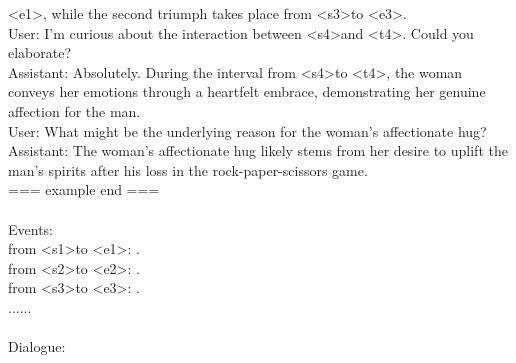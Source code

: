 \documentclass[10pt,twocolumn,letterpaper]{article}
\begin{document}
\begin{figure*}[t]
\begin{tcolorbox}[colback=gray!20, colframe=black, text width=0.9\textwidth, title={Box 4: Prompt for LLM in Stage 3, designed to transform a series of events into high-quality dialogue.}]
\textless e1\textgreater , while the second triumph takes place from \textless s3\textgreater  to \textless e3\textgreater .\\User: I'm curious about the interaction between \textless s4\textgreater  and \textless t4\textgreater . Could you elaborate?\\Assistant: Absolutely. During the interval from \textless s4\textgreater  to \textless t4\textgreater , the woman conveys her emotions through a heartfelt embrace, demonstrating her genuine affection for the man.\\User: What might be the underlying reason for the woman's affectionate hug?\\Assistant: The woman's affectionate hug likely stems from her desire to uplift the man's spirits after his loss in the rock-paper-scissors game.\\=== example end ===\\\\Events:\\ 
from \textless s1\textgreater  to \textless e1\textgreater : \textcolor{blue}{}.\\
from \textless s2\textgreater  to \textless e2\textgreater : \textcolor{blue}{}.\\
from \textless s3\textgreater  to \textless e3\textgreater : \textcolor{blue}{}.\\
...... \\\\
Dialogue:

\end{tcolorbox}

\end{figure*}  
\end{document}
